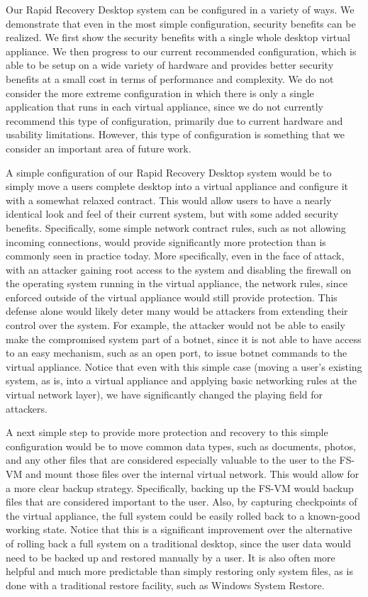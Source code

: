 Our Rapid Recovery Desktop system can be configured in a variety of ways. We demonstrate that even in the most simple configuration, security benefits can be realized. We first show the security benefits with a single whole desktop virtual appliance. We then progress to our current recommended configuration, which is able to be setup on a wide variety of hardware and provides better security benefits at a small cost in terms of performance and complexity. We do not consider the more extreme configuration in which there is only a single application that runs in each virtual appliance, since we do not currently recommend this type of configuration, primarily due to current hardware and usability limitations. However, this type of configuration is something that we consider an important area of future work.

A simple configuration of our Rapid Recovery Desktop system would be to simply move a users complete desktop into a virtual appliance and configure it with a somewhat relaxed contract. This would allow users to have a nearly identical look and feel of their current system, but with some added security benefits. Specifically, some simple network contract rules, such as not allowing incoming connections, would provide significantly more protection than is commonly seen in practice today. More specifically, even in the face of attack, with an attacker gaining root access to the system and disabling the firewall on the operating system running in the virtual appliance, the network rules, since enforced outside of the virtual appliance would still provide protection. This defense alone would likely deter many would be attackers from extending their control over the system. For example, the attacker would not be able to easily make the compromised system part of a botnet, since it is not able to have access to an easy mechanism, such as an open port, to issue botnet commands to the virtual appliance. Notice that even with this simple case (moving a user's existing system, as is, into a virtual appliance and applying basic networking rules at the virtual network layer), we have significantly changed the playing field for attackers.

A next simple step to provide more protection and recovery to this simple configuration would be to move common data types, such as documents, photos, and any other files that are considered especially valuable to the user to the FS-VM and mount those files over the internal virtual network. This would allow for a more clear backup strategy. Specifically, backing up the FS-VM would backup files that are considered important to the user. Also, by capturing checkpoints of the virtual appliance, the full system could be easily rolled back to a known-good working state. Notice that this is a significant improvement over the alternative of rolling back a full system on a traditional desktop, since the user data would need to be backed up and restored manually by a user. It is also often more helpful and much more predictable than simply restoring only system files, as is done with a  traditional restore facility, such as Windows System Restore\cite{windows_system_restore}.

